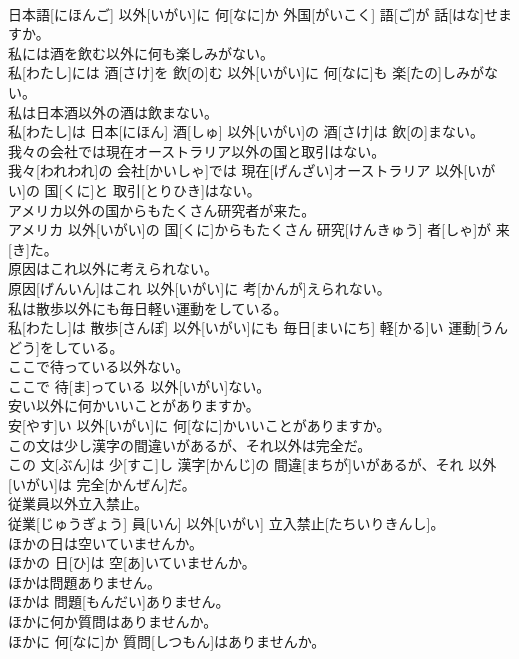 \documentclass[8pt]{extreport}
\begin{document}
\begin{CJK}{UTF8}{min}
\\	日本語[にほんご] 以外[いがい]に 何[なに]か 外国[がいこく] 語[ご]が 話[はな]せますか。
\\	私には酒を飲む以外に何も楽しみがない。	
\\	私[わたし]には 酒[さけ]を 飲[の]む 以外[いがい]に 何[なに]も 楽[たの]しみがない。
\\	私は日本酒以外の酒は飲まない。	
\\	私[わたし]は 日本[にほん] 酒[しゅ] 以外[いがい]の 酒[さけ]は 飲[の]まない。
\\	我々の会社では現在オーストラリア以外の国と取引はない。	
\\	我々[われわれ]の 会社[かいしゃ]では 現在[げんざい]オーストラリア 以外[いがい]の 国[くに]と 取引[とりひき]はない。
\\	アメリカ以外の国からもたくさん研究者が来た。	
\\	アメリカ 以外[いがい]の 国[くに]からもたくさん 研究[けんきゅう] 者[しゃ]が 来[き]た。
\\	原因はこれ以外に考えられない。	
\\	原因[げんいん]はこれ 以外[いがい]に 考[かんが]えられない。
\\	私は散歩以外にも毎日軽い運動をしている。	
\\	私[わたし]は 散歩[さんぽ] 以外[いがい]にも 毎日[まいにち] 軽[かる]い 運動[うんどう]をしている。
\\	ここで待っている以外ない。	
\\	ここで 待[ま]っている 以外[いがい]ない。
\\	安い以外に何かいいことがありますか。	
\\	安[やす]い 以外[いがい]に 何[なに]かいいことがありますか。
\\	この文は少し漢字の間違いがあるが、それ以外は完全だ。	
\\	この 文[ぶん]は 少[すこ]し 漢字[かんじ]の 間違[まちが]いがあるが、それ 以外[いがい]は 完全[かんぜん]だ。
\\	従業員以外立入禁止。 
\\	従業[じゅうぎょう] 員[いん] 以外[いがい] 立入禁止[たちいりきんし]。
\\	ほかの日は空いていませんか。	
\\	ほかの 日[ひ]は 空[あ]いていませんか。
\\	ほかは問題ありません。	
\\	ほかは 問題[もんだい]ありません。
\\	ほかに何か質問はありませんか。	
\\	ほかに 何[なに]か 質問[しつもん]はありませんか。

\end{CJK}
\end{document}
